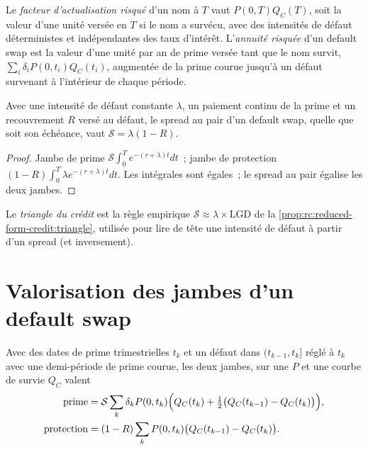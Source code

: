 \begin{definition}\label{def:rc:reduced-form-credit:risky}
Le \emph{facteur d'actualisation risqué} d'un nom à $T$ vaut
$P(0,T)Q_C(T)$, soit la valeur d'une unité versée en $T$ si le nom a survécu, avec
des intensités de défaut déterministes et indépendantes des taux d'intérêt. L'\emph{annuité
risquée} d'un default swap est la valeur d'une unité par an de prime
versée tant que le nom survit, $\sum_i\delta_iP(0,t_i)Q_C(t_i)$, augmentée de la prime
courue jusqu'à un défaut survenant à l'intérieur de chaque période.
\end{definition}

\begin{proposition}\label{prop:rc:reduced-form-credit:triangle}
Avec une intensité de défaut constante $\lambda$, un paiement continu de la prime et un recouvrement $R$ versé au
défaut, le spread au pair d'un default swap, quelle que soit son échéance, vaut
$\mathcal S = \lambda(1-R)$.
\end{proposition}
\begin{proof}
Jambe de prime $\mathcal S\int_0^Te^{-(r+\lambda)t}dt$~; jambe de protection
$(1-R)\int_0^T\lambda e^{-(r+\lambda)t}dt$. Les intégrales sont égales~; le spread au pair
égalise les deux jambes.
\end{proof}

\begin{definition}\label{def:rc:reduced-form-credit:triangledef}
Le \emph{triangle du crédit} est la règle empirique $\mathcal S \approx
\lambda\times\mathrm{LGD}$ de la \cref{prop:rc:reduced-form-credit:triangle}, utilisée pour
lire de tête une intensité de défaut à partir d'un spread (et inversement).
\end{definition}

\section{Valorisation des jambes d'un default swap}

Avec des dates de prime trimestrielles $t_k$ et un défaut dans $(t_{k-1},t_k]$ réglé à $t_k$ avec
une demi-période de prime courue, les deux jambes, sur une  $P$ et une
courbe de survie $Q_C$ valent
\begin{align*}
\text{prime} &= \mathcal S\sum_k\delta_kP(0,t_k)\Bigl(Q_C(t_k)+\tfrac12\bigl(Q_C(t_{k-1})-Q_C(t_k)\bigr)\Bigr),\\
\text{protection} &= (1-R)\sum_kP(0,t_k)\bigl(Q_C(t_{k-1})-Q_C(t_k)\bigr).
\end{align*}

